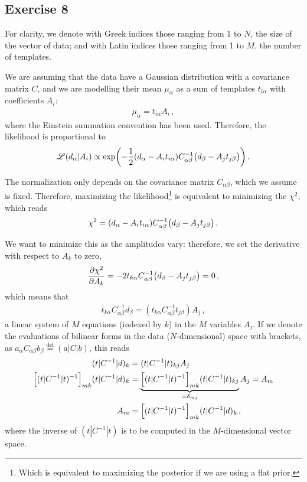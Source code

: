 \documentclass[main.tex]{subfiles}
\begin{document}
\subsection{Exercise 8}

For clarity, we denote with Greek indices those ranging from 1 to \(N\), the size of the vector of data; and with Latin indices those ranging from 1 to \(M\), the number of templates.

We are assuming that the data have a Gaussian distribution with a covariance matrix \(C\), and we are modelling their mean \(\mu_\alpha  \) as a sum of templates \(t_{i \alpha}\) with coefficients \(A_i\):
%
\begin{align}
\mu _\alpha = t_{i \alpha } A_i
\,,
\end{align}
%
where the Einstein summation convention has been used. 
Therefore, the likelihood is proportional to 
%
\begin{align}
\mathscr{L}(d_\alpha | A_i) \propto \exp(- \frac{1}{2} \qty(d_\alpha - A_{i} t_{i \alpha }) C^{-1}_{\alpha \beta } 
\qty(d_\beta - A_j t_{j \beta }))
\,.
\end{align}

The normalization only depends on the covariance matrix \(C_{\alpha \beta }\), which we assume is fixed.
Therefore, maximizing the likelihood\footnote{Which is equivalent to maximizing the posterior if we are using a flat prior.} is equivalent to minimizing the \(\chi^2\), which reads 
%
\begin{align}
\chi^2 = \qty(d_\alpha - A_{i} t_{i \alpha }) C^{-1}_{\alpha \beta } 
\qty(d_\beta - A_j t_{j \beta })
\,.
\end{align}

We want to minimize this as the amplitudes vary: therefore, we set the derivative with respect to \(A_k\) to zero,
%
\begin{align}
\pdv{\chi^2}{A_k} = -2 t_{k \alpha } C^{-1}_{\alpha \beta } \qty(d_\beta - A_j t_{j \beta }) = 0
\,,
\end{align}
%
which means that 
%
\begin{align}
t_{k \alpha } C^{-1}_{\alpha \beta } d_\beta = (t_{k \alpha } C^{-1}_{\alpha \beta }  t_{j \beta }) A_j
\,,
\end{align}
%
a linear system of \(M\) equations (indexed by \(k\)) in the \(M\) variables \(A_j\). 
If we denote the evaluations of bilinear forms in the data (\(N\)-dimensional) space with brackets, as \(a_\alpha C_{\alpha \beta } b_\beta \overset{\text{def}}{=} (a | C |b)\), this reads 
%
\begin{align}
(t | C^{-1} | d)_k &= (t | C^{-1} | t)_{kj} A_j  \\
\qty[(t | C^{-1} | t)^{-1}]_{mk} (t | C^{-1} | d)_k  &=
\underbrace{ \qty[(t | C^{-1} | t)^{-1}]_{mk}
(t | C^{-1} | t)_{kj}}_{= \delta_{mj}} A_j = A_m  \\
A_m &= \qty[(t | C^{-1} | t)^{-1}]_{mk} (t | C^{-1} | d)_k
\,,
\end{align}
%
where the inverse of \((t | C^{-1} | t)\) is to be computed in the \(M\)-dimensional vector space. 
\end{document}
